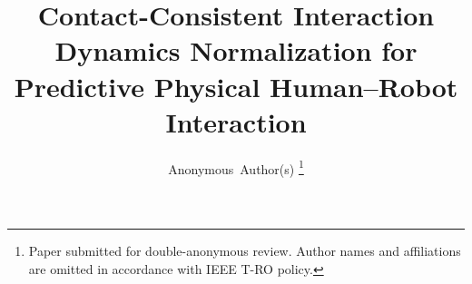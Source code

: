 \documentclass[journal]{IEEEtran}
\begin{document}
\title{Contact-Consistent Interaction Dynamics Normalization for
       Predictive Physical Human--Robot Interaction}

\author{Anonymous~Author(s)%
\thanks{Paper submitted for double-anonymous review. Author names and
affiliations are omitted in accordance with IEEE T-RO policy.}}

\maketitle
\thispagestyle{empty}
\pagestyle{empty}


\end{document}
